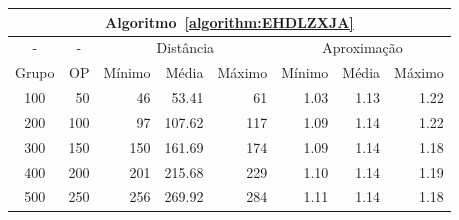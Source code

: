 \begin{table}[!htb]
  \begin{tabular}{|c|r|r|r|r|r|r|r|}
    \hline
    \multicolumn{8}{|c|}{Algoritmo~\ref{algorithm:EHDLZXJA}}                                                                    \\ \hline
      -      & \multicolumn{1}{c|}{-} & \multicolumn{3}{c|}{Distância}             & \multicolumn{3}{c|}{Aproximação}           \\ \hline
    Grupo    & OP                     & Mínimo       & Média        & Máximo       & Mínimo       & Média        & Máximo       \\ \hline  
    100      & 50                     & 46           & 53.41        & 61           & 1.03         & 1.13         & 1.22         \\ \hline
    200      & 100                    & 97           & 107.62       & 117          & 1.09         & 1.14         & 1.22         \\ \hline
    300      & 150                    & 150          & 161.69       & 174          & 1.09         & 1.14         & 1.18         \\ \hline
    400      & 200                    & 201          & 215.68       & 229          & 1.10         & 1.14         & 1.19         \\ \hline
    500      & 250                    & 256          & 269.92       & 284          & 1.11         & 1.14         & 1.18         \\ \hline    
  \end{tabular}
\end{table}
